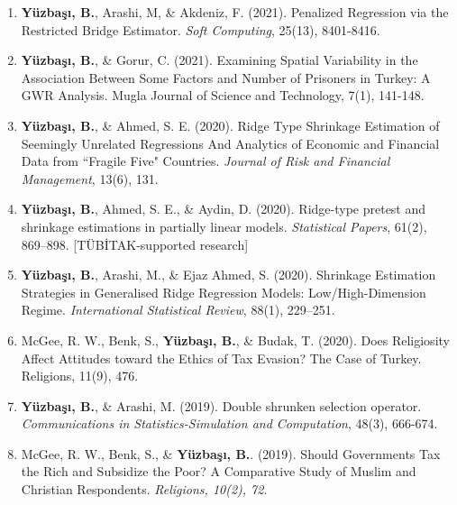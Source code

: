\documentclass[10pt,letterpaper]{article}
\newenvironment{etaremune}{\begin{enumerate}}{\end{enumerate}}
\newcommand{\JournalInfo}[2]{\hspace{0.3em}{\small\textsf{[#1; #2]}}}
\newcommand{\TubitakOutput}{{\small\textsf{[T\"{U}B\.{I}TAK-supported research]}}}
\begin{document}
\begin{etaremune}
\item  {\bf Y\"{u}zba\c{s}{\i}, B.}, Arashi, M, \& Akdeniz, F. (2021). Penalized Regression via the Restricted Bridge Estimator. {\em Soft Computing}, 25(13), 8401-8416. \JournalInfo{SCIE}{Q3}


\item  {\bf Y\"{u}zba\c{s}{\i}, B.}, \& Gorur, C. (2021). Examining Spatial Variability in the Association Between Some Factors and Number of Prisoners in Turkey: A GWR Analysis. Mugla Journal of Science and Technology, 7(1), 141-148.


\item  {\bf Y\"{u}zba\c{s}{\i}, B.}, \& Ahmed, S. E. (2020). Ridge Type Shrinkage Estimation of Seemingly Unrelated Regressions And Analytics of Economic and Financial Data from ``Fragile Five" Countries. {\em Journal of Risk and Financial Management}, 13(6), 131. 

\item  {\bf Y\"{u}zba\c{s}{\i}, B.}, Ahmed, S. E., \& Aydin, D. (2020). Ridge-type pretest and shrinkage estimations in partially linear models. {\em Statistical Papers}, 61(2), 869--898. \JournalInfo{SCIE}{Q2; WoS/JCR 2025} \TubitakOutput
\label{stat_paper}

\item  {\bf Y\"{u}zba\c{s}{\i}, B.}, Arashi, M., \& Ejaz Ahmed, S. (2020). Shrinkage Estimation Strategies in Generalised Ridge Regression Models: Low/High-Dimension Regime. {\em International Statistical Review}, 88(1), 229--251. \JournalInfo{SCIE}{Q1}
\label{int_stat_paper}

\item McGee, R. W., Benk, S., {\bf Y\"{u}zba\c{s}{\i}, B.}, \& Budak, T. (2020). Does Religiosity Affect Attitudes toward the Ethics of Tax Evasion? The Case of Turkey. Religions, 11(9), 476. \JournalInfo{AHCI}{Q1}
\label{robert1_paper}


\item {\bf Y\"{u}zba\c{s}{\i}, B.},  \& Arashi, M. (2019). Double shrunken selection operator. {\em Communications in Statistics-Simulation and Computation}, 48(3), 666-674. \JournalInfo{SCIE}{Q3}

\item
McGee, R. W., Benk, S., \&  {\bf Y\"{u}zba\c{s}{\i}, B.}. (2019). Should Governments Tax the Rich and Subsidize the Poor? A Comparative Study of Muslim and Christian Respondents. {\em Religions, 10(2), 72}. \JournalInfo{AHCI}{Q1}
\label{robert2_paper}





\end{etaremune}
\end{document}
